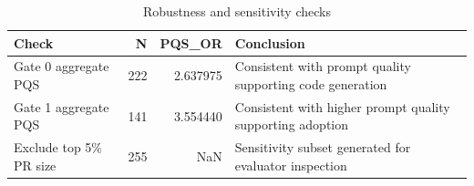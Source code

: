 \begin{table}
\caption{Robustness and sensitivity checks}
\label{tab:sensitivity}
\begin{tabular}{lrrl}
\toprule
Check & N & PQS\_OR & Conclusion \\
\midrule
Gate 0 aggregate PQS & 222 & 2.637975 & Consistent with prompt quality supporting code generation \\
Gate 1 aggregate PQS & 141 & 3.554440 & Consistent with higher prompt quality supporting adoption \\
Exclude top 5\% PR size & 255 & NaN & Sensitivity subset generated for evaluator inspection \\
\bottomrule
\end{tabular}
\end{table}
